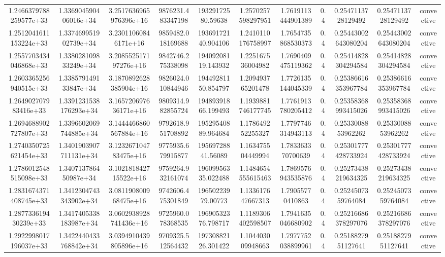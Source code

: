 \begin{table}
\begin{tabular}{ccccccccccc}
1.2466379788259577e+33 & 1.336904590406016e+34 & 3.2517636965976396e+16 & 9876231.483347198 & 19329172580.59638 & 1.2570257598297951 & 1.7619113444901389 & 0.4 & 0.2547113728129492 & 0.2547113728129492 & convective \\
1.2512041611153224e+33 & 1.337469951902739e+34 & 3.23011060846171e+16 & 9859482.018169688 & 19369172140.904106 & 1.2410110176758997 & 1.7654735868530373 & 0.4 & 0.25443002643080204 & 0.25443002643080204 & convective \\
1.2557703434046868e+33 & 1.338028109833249e+34 & 3.208552517197276e+16 & 9842746.275338098 & 19409208119.143932 & 1.225167536004982 & 1.7690409475119362 & 0.4 & 0.25414828304294584 & 0.25414828304294584 & convective \\
1.2603365256940515e+33 & 1.338579149133847e+34 & 3.1870892628385904e+16 & 9826024.010844946 & 19449281150.854797 & 1.209493765201478 & 1.7726135144045339 & 0.4 & 0.25386616353967784 & 0.25386616353967784 & convective \\
1.264902707983416e+33 & 1.3391231538176293e+34 & 3.165720697636171e+16 & 9809314.982855724 & 19489391866.199493 & 1.1939881746177745 & 1.7761913780205412 & 0.4 & 0.25358368993415026 & 0.25358368993415026 & convective \\
1.2694688902727807e+33 & 1.3396602069744885e+34 & 3.1444466860567884e+16 & 9792618.951708892 & 19529540889.964684 & 1.178649252255327 & 1.7797746314943113 & 0.4 & 0.2533008853962262 & 0.2533008853962262 & convective \\
1.2740350725621454e+33 & 1.3401903907711131e+34 & 3.123267104783475e+16 & 9775935.679915877 & 19569728841.56089 & 1.163475504449994 & 1.783363370700639 & 0.4 & 0.25301777428733924 & 0.25301777428733924 & convective \\
1.2786012548515098e+33 & 1.340713786450987e+34 & 3.102181842715522e+16 & 9759264.932161074 & 19609956335.022488 & 1.1484654555615463 & 1.7869576943535876 & 0.4 & 0.25273438219634325 & 0.25273438219634325 & convective \\
1.2831674371408745e+33 & 1.3412304743343902e+34 & 3.081190800968475e+16 & 9742606.475301849 & 19650223979.00773 & 1.133617647667313 & 1.79055770410863 & 0.4 & 0.2524507359764084 & 0.2524507359764084 & convective \\
1.287733619430239e+33 & 1.3417405338183987e+34 & 3.0602938928741436e+16 & 9725960.078368535 & 19690532376.798717 & 1.1189306402598507 & 1.7941635046680902 & 0.4 & 0.25216686378297076 & 0.25216686378297076 & convective \\
1.2922998017196037e+33 & 1.3422440433768842e+34 & 3.0394910439805896e+16 & 9709325.512564432 & 19730882126.301422 & 1.104403009948663 & 1.7977752038899961 & 0.4 & 0.2518827951127641 & 0.2518827951127641 & convective \\

\end{tabular}
\end{table}
